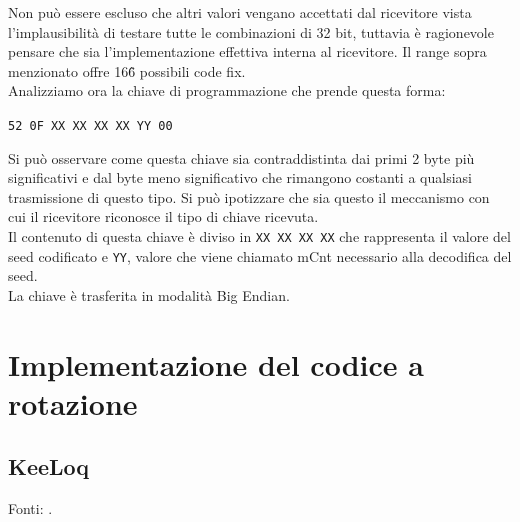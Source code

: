 Non può essere escluso che altri valori vengano accettati dal ricevitore vista l’implausibilità di testare tutte le combinazioni di 32 bit, tuttavia è ragionevole pensare che sia l’implementazione effettiva interna al ricevitore. Il range sopra menzionato offre 16\^6 possibili code fix.\\
Analizziamo ora la chiave di programmazione che prende questa forma:
\begin{center}
  \texttt{52 0F XX XX XX XX YY 00}
\end{center}
Si può osservare come questa chiave sia contraddistinta dai primi 2 byte più significativi e dal byte meno significativo che rimangono costanti a qualsiasi trasmissione di questo tipo. Si può ipotizzare che sia questo il meccanismo con cui il ricevitore riconosce il tipo di chiave ricevuta.\\
Il contenuto di questa chiave è diviso in \texttt{XX XX XX XX} che rappresenta il valore del seed codificato e \texttt{YY}, valore che viene chiamato mCnt necessario alla decodifica del seed.\\
La chiave è trasferita in modalità Big Endian.

\section{Implementazione del codice a rotazione}
\label{sec:rolling}

\subsection{KeeLoq}
\label{sub:keeloq}

Fonti: \cite{keeloqwiki,keeloqc,algebraic_slide,cryptoeprint,periodic_ciphers}.\\

